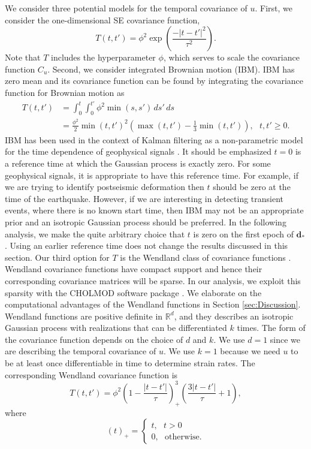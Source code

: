\documentclass[10pt,letter]{article}
\begin{document}
We consider three potential models for the temporal covariance of $u$. First, we consider the one-dimensional SE covariance function, 
\begin{equation}\label{eq:TimeSE}
T(t,t') = \phi^2\exp\left(\frac{-|t - t'|^2}{\tau^2}\right).
\end{equation}
Note that $T$ includes the hyperparameter $\phi$, which serves to scale the covariance function $C_u$. Second, we consider integrated Brownian motion (IBM). IBM has zero mean and its covariance function can be found by integrating the covariance function for Brownian motion as
\begin{align}\label{eq:IBM}
T(t,t') &= \int_0^t \int_0^{t'} \phi^2 \min(s,s') \,ds'\,ds \\
        &= \frac{\phi^2}{2}\min(t,t')^2 \left(\max(t,t') - \frac{1}{3}\min(t,t')\right), \ \ \ t,t' \geq 0.
\end{align}
IBM has been used in the context of Kalman filtering as a non-parametric model for the time dependence of geophysical signals \citep[e.g.,][]{Segall1997,McGuire2003,Ohtani2010,Hines2016}. It should be emphasized $t=0$ is a reference time at which the Gaussian process is exactly zero. For some geophysical signals, it is appropriate to have this reference time. For example, if we are trying to identify postseismic deformation then $t$ should be zero at the time of the earthquake.  However, if we are interesting in detecting transient events, where there is no known start time, then IBM may not be an appropriate prior and an isotropic Gaussian process should be preferred. In the following analysis, we make the quite arbitrary choice that $t$ is zero on the first epoch of $\bm{d}_*$. Using an earlier reference time does not change the results discussed in this section. Our third option for $T$ is the Wendland class of covariance functions \citep{Wendland2005}. Wendland covariance functions have compact support and hence their corresponding covariance matrices will be sparse. In our analysis, we exploit this sparsity with the CHOLMOD software package \citep{Chen2008}. We elaborate on the computational advantages of the Wendland functions in Section \ref{sec:Discussion}. Wendland functions are positive definite in $\mathbb{R}^d$, and they describes an isotropic Gaussian process with realizations that can be differentiated $k$ times. The form of the covariance function depends on the choice of $d$ and $k$. We use $d=1$ since we are describing the temporal covariance of $u$. We use $k=1$ because we need $u$ to be at least once differentiable in time to determine strain rates. The corresponding Wendland covariance function is 
\begin{equation}\label{eq:Wendland}
T(t,t') = \phi^2\left(1 - \frac{|t - t'|}{\tau}\right)^3_+ \left(\frac{3|t - t'|}{\tau} + 1\right), 
\end{equation}
where
\begin{equation}
(t)_+ = 
\begin{cases}
t, \ \ \ t > 0 \\
0, \ \ \ \mathrm{otherwise}.
\end{cases}
\end{equation}
\end{document}
